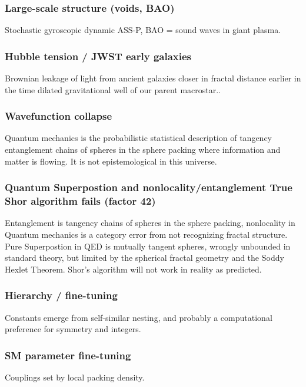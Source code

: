\documentclass[11pt,a4paper]{article}
\begin{document}
    \subsubsection{
    Large-scale structure (voids, BAO)
    }
    Stochastic gyroscopic dynamic ASS-P, BAO = sound waves in giant plasma.


    \subsubsection{
    Hubble tension / JWST early galaxies
    }
    Brownian leakage of light from ancient galaxies closer in fractal distance earlier in the time dilated gravitational well of our parent macrostar..

    \subsubsection{
     Wavefunction collapse 
     }

    Quantum mechanics is the probabilistic statistical description of tangency entanglement chains of spheres in the sphere packing where information and matter is flowing. It is not epistemological in this universe. 


    \subsubsection{
     Quantum Superpostion and nonlocality/entanglement
    True Shor algorithm fails (factor 42)
     } 
     Entanglement is tangency chains of spheres in the sphere packing, nonlocality in Quantum mechanics is a category error from not recognizing fractal structure. Pure Superpostion in QED is mutually tangent spheres, wrongly unbounded in standard theory, but limited by the spherical fractal geometry and the Soddy Hexlet Theorem. Shor's algorithm will not work in reality as predicted. 

    \subsubsection{
     Hierarchy / fine-tuning 
     } 
    Constants emerge from self-similar nesting, and probably a computational preference for symmetry and integers. 

    \subsubsection{
     SM parameter fine-tuning 
     } 
    Couplings set by local packing density.
\end{document}
